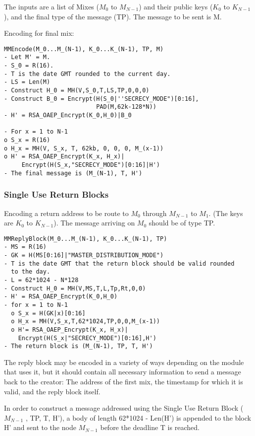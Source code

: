 \documentclass{article}
\begin{document}
The inputs are a list of Mixes ($M_0$ to $M_{N-1}$) and their public
keys ($K_0$ to $K_{N-1}$), and the final type of the message (TP). The
message to be sent is M.

Encoding for final mix: 

\begin{verbatim}
MMEncode(M_0...M_(N-1), K_0...K_(N-1), TP, M)
- Let M' = M.
- S_0 = R(16).
- T is the date GMT rounded to the current day.
- LS = Len(M)
- Construct H_0 = MH(V,S_0,T,LS,TP,0,0,0)
- Construct B_0 = Encrypt(H(S_0|''SECRECY_MODE")[0:16],
                          PAD(M,62k-128*N))
- H' = RSA_OAEP_Encrypt(K_0,H_0)|B_0

- For x = 1 to N-1
o S_x = R(16)
o H_x = MH(V, S_x, T, 62kb, 0, 0, 0, M_(x-1))
o H' = RSA_OAEP_Encrypt(K_x, H_x)|
     Encrypt(H(S_x,"SECRECY_MODE")[0:16]|H')
- The final message is (M_(N-1), T, H')
\end{verbatim}

\subsubsection{Single Use Return Blocks}

Encoding a return address to be route to $M_0$ through $M_{N-1}$ to
$M_1$. (The keys are $K_0$ to $K_{N-1}$). The message arriving on $M_0$
should be of type TP.

\begin{verbatim}
MMReplyBlock(M_0...M_(N-1), K_0...K_(N-1), TP)
- MS = R(16)
- GK = H(MS[0:16]|"MASTER_DISTRIBUTION_MODE")
- T is the date GMT that the return block should be valid rounded
  to the day. 
- L = 62*1024 - N*128
- Construct H_0 = MH(V,MS,T,L,Tp,Rt,0,0)
- H' = RSA_OAEP_Encrypt(K_0,H_0)
- for x = 1 to N-1
  o S_x = H(GK|x)[0:16]
  o H_x = MH(V,S_x,T,62*1024,TP,0,0,M_(x-1))
  o H'= RSA_OAEP_Encrypt(K_x, H_x)| 
    Encrypt(H(S_x|"SECRECY_MODE")[0:16],H')
- The return block is (M_(N-1), TP, T, H')
\end{verbatim}

The reply block may be encoded in a variety of ways depending on the
module that uses it, but it should contain all necessary information
to send a message back to the creator: The address of the first mix,
the timestamp for which it is valid, and the reply block itself.

In order to construct a message addressed using the Single Use Return
Block ($M_{N-1}$ , TP, T, H'), a body of length 62*1024 - Len(H') is appended
to the block H' and sent to the node $M_{N-1}$ before the deadline T
is reached. 
\end{document}
